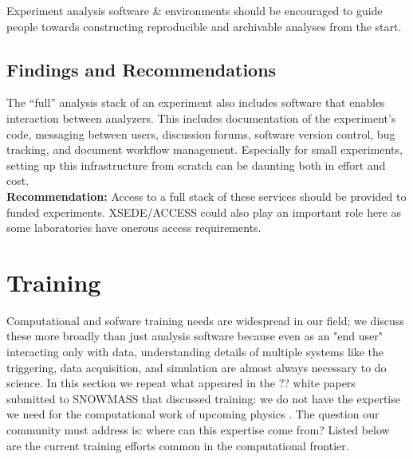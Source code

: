 Experiment analysis software \& environments should be encouraged to guide people towards constructing reproducible and archivable analyses from the start.

\subsection{Findings and Recommendations}
The “full” analysis stack of an experiment also includes software that enables interaction between analyzers. This includes documentation of the experiment's code, messaging between users, discussion forums, software version control, bug tracking, and document workflow management. Especially for small experiments, setting up this infrastructure from scratch can be daunting both in effort and cost.\\
\textbf{Recommendation:} Access to a full stack of these services should be provided to funded experiments.  XSEDE/ACCESS could also play an important role here as some laboratories have onerous access requirements.

\section{Training}\label{sec:training}

Computational and sofware training needs are widespread in our field; we discuss these more broadly than just analysis software because even as an "end user" interacting only with data, understanding details of multiple systems like the triggering, data acquisition, and simulation are almost always necessary to do science.  In this section we repeat what appeared in the ?? white papers submitted to SNOWMASS that discussed training: we do not have the expertise we need for the computational work of upcoming physics \cite{}.  The question our community must address is: where can this expertise come from?  Listed below are the current training efforts common in the computational frontier. 

